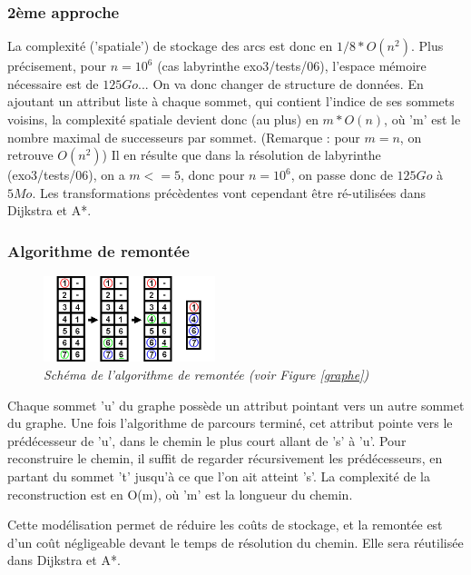 \documentclass[10pt]{article}
\begin{document}
			\subsubsection{2ème approche}
				La complexité ('spatiale') de stockage des arcs est donc en \(1/8*O(n^2)\).
				Plus précisement, pour \(n=10^6\) (cas labyrinthe exo3/tests/06),
				l'espace mémoire nécessaire est de \(125Go\)... On va donc changer de structure de données.
				En ajoutant un attribut liste à chaque sommet, qui contient l'indice de ses sommets voisins,
				la complexité spatiale devient donc (au plus) en \(m * O(n)\), où 'm' est
				le nombre maximal de successeurs par sommet. (Remarque : pour \(m = n\), on retrouve \(O(n^2)\))
				Il en résulte que dans la résolution de labyrinthe (exo3/tests/06), on a \(m <= 5\), donc pour \(n=10^6\),
				on passe donc de \(125Go\) à \(5 Mo\). Les transformations précèdentes vont cependant être ré-utilisées
				dans Dijkstra et A*.
				
			\subsubsection{Algorithme de remontée}

				\begin{figure}
					\includegraphics[width=5cm]{./images/remonte.png}
					\caption{\textit{Schéma de l'algorithme de remontée (voir Figure \ref{graphe})}}
				\end{figure}

				Chaque sommet 'u' du graphe possède un attribut pointant vers un autre sommet du graphe.
				Une fois l'algorithme de parcours terminé, cet attribut pointe vers le prédécesseur de 'u',
				dans le chemin le plus court allant de 's' à 'u'.
				Pour reconstruire le chemin, il suffit de regarder récursivement les prédécesseurs, en partant du sommet
				't' jusqu'à ce que l'on ait atteint 's'.
				La complexité de la reconstruction est en O(m), où 'm' est la longueur du chemin.\newline
				
				Cette modélisation permet de réduire les coûts de stockage, et la remontée est d'un coût
				négligeable devant le temps de résolution du chemin. Elle sera réutilisée dans Dijkstra et A*.
			
\end{document}
